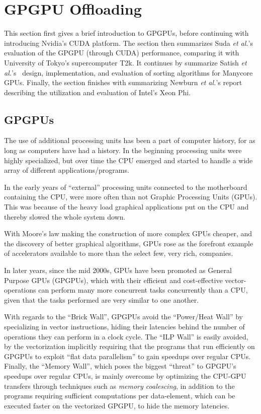 
\section{GPGPU Offloading}
\label{sec:nvidia}

This section first gives a brief introduction to GPGPUs, before continuing with introducing Nvidia's CUDA platform.
The section then summarizes Suda \textit{et al.}'s~\cite{Suda:2009:AGG:1509633.1509696} evaluation of the GPGPU (through CUDA) performance, comparing it with University of Tokyo's supercomputer T2k.
It continues by summarize Satish \textit{et al.}'s~\cite{Satish:2009:DES:1586640.1587667} design, implementation, and evaluation of sorting algorithms for Manycore GPUs.
Finally, the section finishes with summarizing Newburn \textit{et al.}'s report describing the utilization and evaluation of Intel's Xeon Phi\texttrademark.

\subsection{GPGPUs}

The use of additional processing units has been a part of computer history, for as long as computers have had a history.
In the beginning processing units were highly specialized, but over time the CPU emerged and started to handle a wide array of different applications/programs.

In the early years of ``external'' processing units connected to the motherboard containing the CPU, were more often than not Graphic Processing Units (GPUs).
This was because of the heavy load graphical applications put on the CPU and thereby slowed the whole system down.

With Moore's law making the construction of more complex GPUs cheaper, and the discovery of better graphical algorithms, GPUs rose as the forefront example of accelerators available to more than the select few, very rich, companies.

In later years, since the mid 2000s, GPUs have been promoted as General Purpose GPUs (GPGPUs), which with their efficient and cost-effective vector-operations can perform many more concurrent tasks concurrently than a CPU, given that the tasks performed are very similar to one another.

With regards to the ``Brick Wall'', GPGPUs avoid the ``Power/Heat Wall'' by specializing in vector instructions, hiding their latencies behind the number of operations they can perform in a clock cycle.
The ``ILP Wall'' is easily avoided, by the vectorization implicitly requiring that the programs that run efficiently on GPGPUs to exploit ``flat data parallelism'' to gain speedups over regular CPUs.
Finally, the ``Memory Wall'', which poses the biggest ``threat'' to GPGPU's speedups over regular CPUs, is mainly overcome by optimizing the CPU-GPU transfers through techniques such as \textit{memory coalescing}, in addition to the programs requiring sufficient computations per data-element, which can be executed faster on the vectorized GPGPU, to hide the memory latencies.

